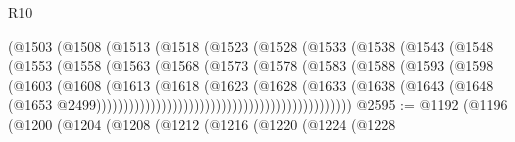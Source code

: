 \begin{lexlean}{R10}
\begin{coremodule}
{{{{{{{{{{{{{{{{{{{{{{{{{{{{{{{{{{{{{{{{{{{{{{{{{{{{{{{{{{{{{{{{{{{{{{{{{{{{{{{{{{{{{{{{{{{{{{{{{{{{{{{{{{{{                                    (@1503
                                      (@1508
                                        (@1513
                                          (@1518
                                            (@1523
                                              (@1528
                                                (@1533
                                                  (@1538
                                                    (@1543
                                                      (@1548
                                                        (@1553
                                                          (@1558
                                                            (@1563
                                                              (@1568
                                                                (@1573
                                                                  (@1578
                                                                    (@1583
                                                                      (@1588
                                                                        (@1593
                                                                          (@1598
                                                                            (@1603
                                                                              (@1608
                                                                                (@1613
                                                                                  (@1618
                                                                                    (@1623
                                                                                      (@1628
                                                                                        (@1633
                                                                                          (@1638
                                                                                            (@1643
                                                                                              (@1648
                                                                                                (@1653
                                                                                                  @2499)))))))))))))))))))))))))))))))))))))))))))))))
@2595 := @1192
    (@1196
      (@1200
        (@1204
          (@1208
            (@1212
              (@1216
                (@1220
                  (@1224
                    (@1228
}}}}}}}}}}}}}}}}}}}}}}}}}}}}}}}}}}}}}}}}}}}}}}}}}}}}}}}}}}}}}}}}}}}}}}}}}}}}}}}}}}}}}}}}}}}}}}}}}}}}}}}}}}}}
\end{coremodule}
\end{lexlean}
